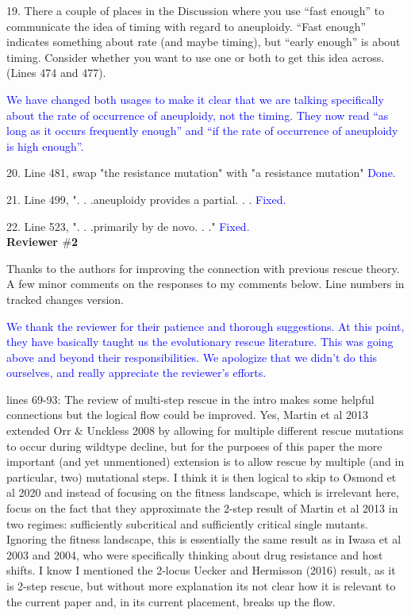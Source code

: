 \documentclass[12pt]{extarticle}
\begin{document}
19. There a couple of places in the Discussion where you use ``fast enough'' to communicate the idea of timing with regard to aneuploidy. ``Fast enough'' indicates something about rate (and maybe timing), but ``early enough'' is about timing. Consider whether you want to use one or both to get this idea across. (Lines 474 and 477).

\textcolor{blue}{We have changed both usages to make it clear that we are talking specifically about the rate of occurrence of aneuploidy, not the timing. They now read ``as long as it occurs frequently enough'' and ``if the rate of occurrence of aneuploidy is high enough''. }%

20. Line 481, swap "the resistance mutation" with "a resistance mutation"
\textcolor{blue}{Done. }%

21. Line 499, ". . .aneuploidy provides a partial. . .
\textcolor{blue}{Fixed.}%

22. Line 523, ". . .primarily by de novo. . ."
\textcolor{blue}{Fixed. }%
\\

\textbf{Reviewer $\#$2}

Thanks to the authors for improving the connection with previous rescue theory. A few minor comments on the responses to my comments below. Line numbers in tracked changes version.

\textcolor{blue}{We thank the reviewer for their patience and thorough suggestions. At this point, they have basically taught us the evolutionary rescue literature. 
This was going above and beyond their responsibilities. 
We apologize that we didn't do this ourselves, and really appreciate the reviewer's efforts.}

lines 69-93: The review of multi-step rescue in the intro makes some helpful connections but the logical flow could be improved. Yes, Martin et al 2013 extended Orr $\&$ Unckless 2008 by allowing for multiple different rescue mutations to occur during wildtype decline, but for the purposes of this paper the more important (and yet unmentioned) extension is to allow rescue by multiple (and in particular, two) mutational steps. I think it is then logical to skip to Osmond et al 2020 and instead of focusing on the fitness landscape, which is irrelevant here, focus on the fact that they approximate the 2-step result of Martin et al 2013 in two regimes: sufficiently subcritical and sufficiently critical single mutants. Ignoring the fitness landscape, this is essentially the same result as in Iwasa et al 2003 and 2004, who were specifically thinking about drug resistance and host shifts. I know I mentioned the 2-locus Uecker and Hermisson (2016) result, as it is 2-step rescue, but without more explanation its not clear how it is relevant to the current paper and, in its current placement, breaks up the flow.
\end{document}
